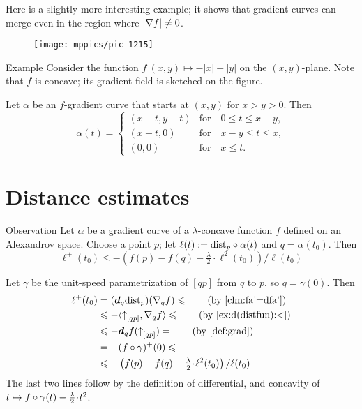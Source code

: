 Here is a slightly more interesting example;
it shows that gradient curves can merge even in the region where $|\nabla f|\z\ne 0$. 


\begin{wrapfigure}[8]{r}{34 mm}
\vskip-0mm
\centering
\texttt{[image: mppics/pic-1215]}
\vskip0mm
\end{wrapfigure}

\begin{thm}{Example}
Consider the function $f\:(x,y)\mapsto-|x|-|y|$ on the $(x,y)$-plane.
Note that $f$ is concave;
its gradient field is sketched on the figure.

Let $\alpha$ be an $f$-gradient curve that starts at $(x,y)$ for $x>y>0$.
Then 
\[\alpha(t)=
\begin{cases}
(x-t,y-t) &\text{for}\quad 0\le t\le  x-y,
\\
(x-t,0) &\text{for}\quad x-y\le t\le  x,
\\
(0,0) &\text{for}\quad x\le t.
\end{cases}
\]

\end{thm}


\section{Distance estimates}

\begin{thm}{Observation}\label{eq:fist-var-inq+}
Let $\alpha$ be a gradient curve of a $\lambda$-concave function $f$ 
defined on an Alexandrov space.
Choose a point $p$; let $\ell(t)\mathrel{:=}\mathrm{dist}_p\circ\alpha(t)$ and $q=\alpha(t_0)$.
Then 
\[
\ell^+(t_0)\le -\left({f(p)}-{f(q)}-\tfrac\lambda2\cdot\ell^2(t_0)\right)/\ell(t_0)
\]
\end{thm}

Let $\gamma$ be the unit-speed parametrization of $[qp]$ from $q$ to $p$, so $q=\gamma(0)$.
Then 
\begin{align*}
\ell^+(t_0)&=(\dd_q\distfun_p)(\nabla_qf)\le\tag{by \ref{clm:fa'=dfa'}}
\\
&\le -\langle\dir qp,\nabla_qf\rangle \le \tag{by \ref{ex:d(distfun):<}}
\\
&\le -\dd_qf(\dir qp)=\tag{by \ref{def:grad}}
\\
&=-(f\circ\gamma)^+(0)\le 
\\
&\le -\left({f(p)}-{f(q)}-\tfrac\lambda2\cdot\ell^2(t_0)\right)/\ell(t_0)
\end{align*}
The last two lines follow by
the definition of differential,
and concavity of $t\z\mapsto f\circ\gamma(t)-\tfrac \lambda2\cdot {t^2}$.
\qeds

